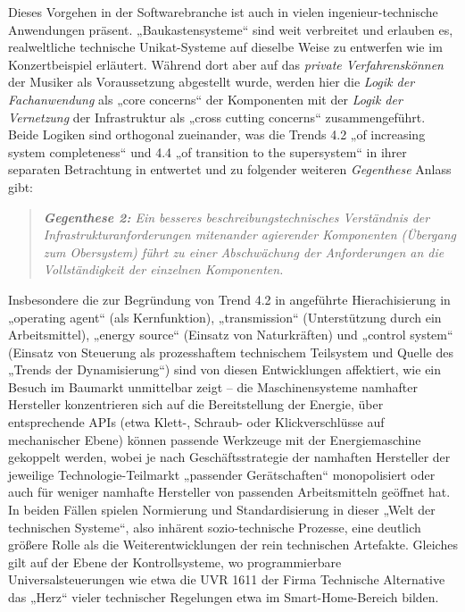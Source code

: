 \documentclass[11pt,a4paper]{article}
\begin{document}
Dieses Vorgehen in der Softwarebranche ist auch in vielen ingenieur-technische
Anwendungen präsent. „Baukastensysteme“ sind weit verbreitet und erlauben es,
realweltliche technische Unikat-Systeme auf dieselbe Weise zu entwerfen wie im
Konzertbeispiel erläutert. Während dort aber auf das \emph{private
  Verfahrenskönnen} der Musiker als Voraussetzung abgestellt wurde, werden
hier die \emph{Logik der Fachanwendung} als „core concerns“ der Komponenten
mit der \emph{Logik der Vernetzung} der Infrastruktur als „cross cutting
concerns“ zusammengeführt. Beide Logiken sind orthogonal zueinander, was die
Trends 4.2 „of increasing system completeness“ und 4.4 „of transition to the
supersystem“ in ihrer separaten Betrachtung in \cite{TESE2018} entwertet und
zu folgender weiteren \emph{Gegenthese} Anlass gibt:
\begin{quote}\it 
  \textbf{Gegenthese 2:} Ein besseres beschreibungstechnisches Verständnis der
  Infrastrukturanforderungen mitenander agierender Komponenten (Übergang zum
  Obersystem) führt zu einer Abschwächung der Anforderungen an die
  Vollständigkeit der einzelnen Komponenten.
\end{quote}
Insbesondere die zur Begründung von Trend 4.2 in \cite{TESE2018} angeführte
Hierachisierung in „operating agent“ (als Kernfunktion), „transmission“
(Unterstützung durch ein Arbeitsmittel), „energy source“ (Einsatz von
Naturkräften) und „control system“ (Einsatz von Steuerung als prozesshaftem
technischem Teilsystem und Quelle des „Trends der Dynamisierung“) sind von
diesen Entwicklungen affektiert, wie ein Besuch im Baumarkt unmittelbar zeigt
-- die Maschinensysteme namhafter Hersteller konzentrieren sich auf die
Bereitstellung der Energie, über entsprechende APIs (etwa Klett-, Schraub-
oder Klickverschlüsse auf mechanischer Ebene) können passende Werkzeuge mit
der Energiemaschine gekoppelt werden, wobei je nach Geschäftsstrategie der
namhaften Hersteller der jeweilige Technologie-Teilmarkt „passender
Gerätschaften“ monopolisiert oder auch für weniger namhafte Hersteller von
passenden Arbeitsmitteln geöffnet hat. In beiden Fällen spielen Normierung und
Standardisierung in dieser „Welt der technischen Systeme“, also inhärent
sozio-technische Prozesse, eine deutlich größere Rolle als die
Weiterentwicklungen der rein technischen Artefakte. Gleiches gilt auf der
Ebene der Kontrollsysteme, wo programmierbare Universalsteuerungen wie etwa
die UVR 1611 der Firma Technische Alternative das „Herz“ vieler technischer
Regelungen etwa im Smart-Home-Bereich bilden.  
\end{document}
